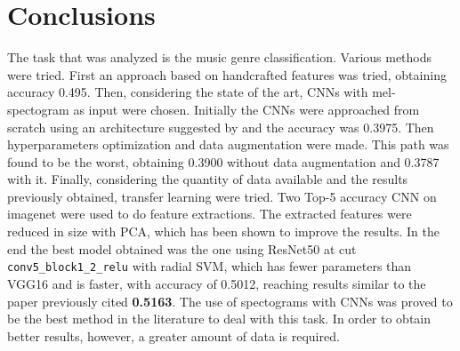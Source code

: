\section{Conclusions}
The task that was analyzed is the music genre classification.
Various methods were tried.
First an approach based on handcrafted features was tried, obtaining accuracy 0.495.
Then, considering the state of the art, CNNs with mel-spectogram as input were chosen. 
Initially the CNNs were approached from scratch using an architecture suggested by \cite{kostrzewa2021music} and the accuracy was 0.3975. 
Then hyperparameters optimization and data augmentation were made. 
This path was found to be the worst, obtaining 0.3900 without data augmentation and 0.3787 with it.
Finally, considering the quantity of data available and the results previously obtained, transfer learning were tried.
Two Top-5 accuracy CNN on imagenet were used to do feature extractions.
The extracted features were reduced in size with PCA, which has been shown to improve the results.
In the end the best model obtained was the one using ResNet50 at cut \texttt{conv5\_block1\_2\_relu} with radial SVM, which has fewer parameters than VGG16 and is faster, with accuracy of 0.5012, reaching results similar to the paper previously cited \textbf{0.5163}.
The use of spectograms with CNNs was proved to be the best method in the literature to deal with this task.
In order to obtain better results, however, a greater amount of data is required.
